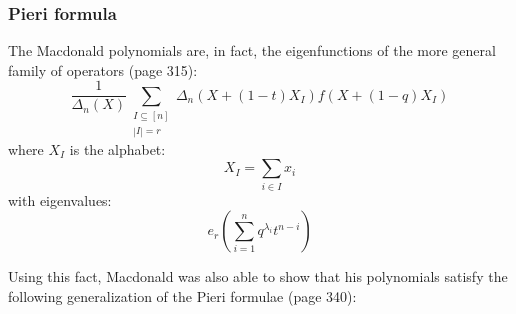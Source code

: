 \documentclass[12pt,dvips]{amsart}
\begin{document}


\bigskip\bigskip
\subsubsection{Pieri formula}
The Macdonald polynomials are, in fact, the eigenfunctions of the more general family of operators \cite{BLACK} (page 315):
$$ \frac{1}{\Delta_n(X)} \sum_{\substack{I \subseteq [n] \\ |I| = r}} \Delta_n(X + (1-t)X_I) f(X + (1-q)X_I)$$
where $X_I$ is the alphabet:
$$ X_I = \sum_{i \in I} x_i$$
with eigenvalues:
$$e_r \left (\sum_{i=1}^n q^{\lambda_i} t^{n-i} \right )$$

\medskip
Using this fact, Macdonald was also able to show that his polynomials satisfy the following generalization of the Pieri formulae \cite{BLACK} (page 340):
\end{document}
